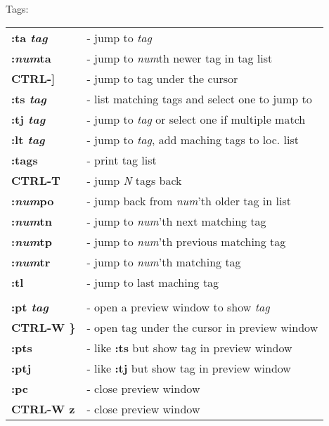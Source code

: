\documentclass[a4paper,8pt]{extarticle}
\begin{document}
\begin{multicols*}{3}
        \noindent
        {\large Tags:}\\
        \begin{tabular}{ l l }
            \textbf{:ta \textsl{tag}}           &    - jump to \textsl{tag}                                 \\
            \textbf{:\textsl{num}ta}            &    - jump to \textsl{num}th newer tag in tag list         \\
            \textbf{CTRL-]}                     &    - jump to tag under the cursor                         \\
            \textbf{:ts \textsl{tag}}           &    - list matching tags and select one to jump to         \\
            \textbf{:tj \textsl{tag}}           &    - jump to \textsl{tag} or select one if multiple match \\
            \textbf{:lt \textsl{tag}}           &    - jump to \textsl{tag}, add maching tags to loc. list  \\
            \textbf{:tags}                      &    - print tag list                                       \\
            \textbf{CTRL-T}                     &    - jump \textsl{N} tags back                            \\
            \textbf{:\textsl{num}po}            &    - jump back from \textsl{num}'th older tag in list     \\
            \textbf{:\textsl{num}tn}            &    - jump to \textsl{num}'th next matching tag            \\
            \textbf{:\textsl{num}tp}            &    - jump to \textsl{num}'th previous matching tag        \\
            \textbf{:\textsl{num}tr}            &    - jump to \textsl{num}'th matching tag                 \\
            \textbf{:tl}                        &    - jump to last maching tag                             \\
                                                &                                                           \\
            \textbf{:pt \textsl{tag}}           &    - open a preview window to show \textsl{tag}           \\
            \textbf{CTRL-W \}}                  &    - open tag under the cursor in preview window          \\
            \textbf{:pts}                       &    - like \textbf{:ts} but show tag in preview window     \\
            \textbf{:ptj}                       &    - like \textbf{:tj} but show tag in preview window     \\
            \textbf{:pc}                        &    - close preview window                                 \\
            \textbf{CTRL-W z}                   &    - close preview window                                 \\
        \end{tabular}


\end{multicols*}
\end{document}
